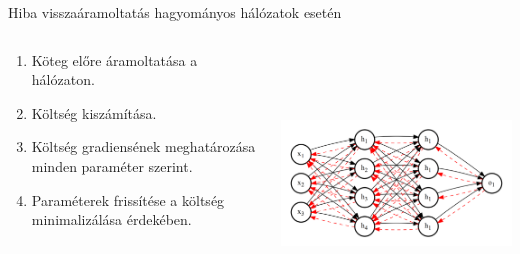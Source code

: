 \documentclass[english, aspectratio=169]{beamer}
\begin{document}
\begin{frame}{Hiba visszaáramoltatás hagyományos hálózatok esetén}
\begin{columns}
\begin{column}{.4\textwidth}
\begin{enumerate}
	\item Köteg előre áramoltatása a hálózaton.
	\item Költség kiszámítása.
	\item Költség gradiensének meghatározása minden paraméter szerint. 
	\item Paraméterek frissítése a költség minimalizálása érdekében.
\end{enumerate}
\end{column}
\begin{column}{.7\textwidth}
\begin{center}
\includegraphics[height=7cm, width=10cm, keepaspectratio]{graphs/recurrent_9.png}
\end{center}
\end{column}
\end{columns}
\end{frame}
\end{document}
